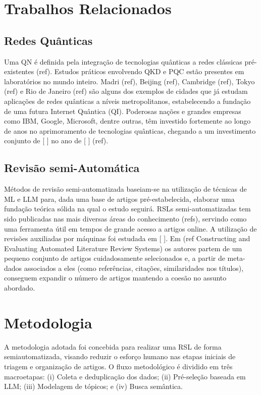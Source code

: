 \documentclass{siintec}
\begin{document}
\section{Trabalhos Relacionados}

\subsection{Redes Quânticas}
Uma QN é definida pela integração de tecnologias quânticas a redes clássicas pré-existentes (ref). Estudos práticos envolvendo QKD e PQC estão presentes em laboratórios no mundo inteiro. Madri (ref), Beijing (ref), Cambridge (ref), Tokyo (ref) e Rio de Janeiro (ref) são alguns dos exemplos de cidades que já estudam aplicações de redes quânticas a níveis metropolitanos, estabelecendo a fundação de uma futura Internet Quântica (QI). Poderosas nações e grandes empresas como IBM, Google, Microsoft, dentre outras, têm investido fortemente ao longo de anos no aprimoramento de tecnologias quânticas, chegando a um investimento conjunto de [ ] no ano de [ ]  (ref).

\subsection{Revisão semi-Automática}
Métodos de revisão semi-automatizada baseiam-se na utilização de técnicas de ML e LLM para, dada uma base de artigos pré-estabelecida, elaborar uma fundação teórica sólida na qual o estudo seguirá. RSLs semi-automatizadas tem sido publicadas nas mais diversas áreas do conhecimento (refs), servindo como uma ferramenta útil em tempos de grande acesso a artigos online.
A utilização de revisões auxiliadas por máquinas foi estudada em [ ].
Em (ref Constructing and Evaluating Automated Literature Review Systems) os autores partem de um pequeno conjunto de artigos cuidadosamente selecionados e, a partir de meta-dados associados a eles (como referências, citações, similaridades nos títulos), conseguem expandir o número de artigos mantendo a coesão no assunto abordado.

\section{Metodologia}
A metodologia adotada foi concebida para realizar uma RSL de forma semiautomatizada, visando reduzir o esforço humano nas etapas iniciais de triagem e organização de artigos. O fluxo metodológico é dividido em três macroetapas: (i) Coleta e deduplicação dos dados; (ii) Pré-seleção baseada em LLM; (iii) Modelagem de tópicos; e (iv) Busca semântica.
\end{document}
